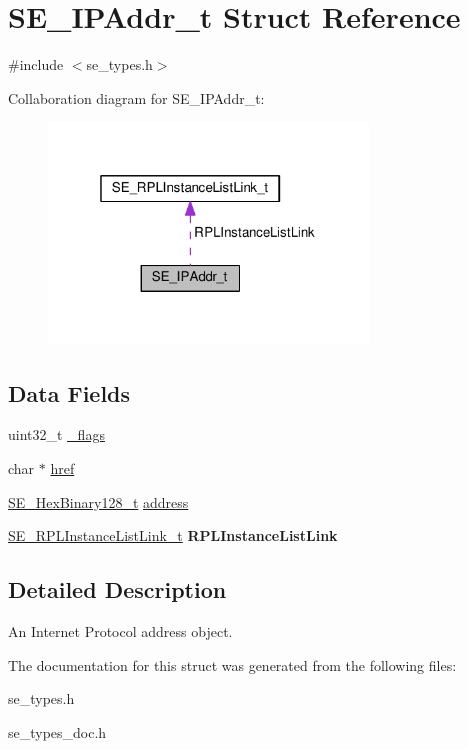 \hypertarget{structSE__IPAddr__t}{}\section{S\+E\+\_\+\+I\+P\+Addr\+\_\+t Struct Reference}
\label{structSE__IPAddr__t}


{\ttfamily \#include $<$se\+\_\+types.\+h$>$}



Collaboration diagram for S\+E\+\_\+\+I\+P\+Addr\+\_\+t\+:\nopagebreak
\begin{figure}[H]
\begin{center}
\leavevmode
\includegraphics[width=241pt]{structSE__IPAddr__t__coll__graph}
\end{center}
\end{figure}
\subsection*{Data Fields}
\begin{DoxyCompactItemize}
\item 
uint32\+\_\+t \hyperlink{group__IPAddr_ga557111ee3a94eb2e68cf42e62bfba40a}{\+\_\+flags}
\item 
char $\ast$ \hyperlink{group__IPAddr_ga3cd3e44c3eb563d397ff73361448715a}{href}
\item 
\hyperlink{group__HexBinary128_gae3e6f0afe8ab371017bc37a0831926c5}{S\+E\+\_\+\+Hex\+Binary128\+\_\+t} \hyperlink{group__IPAddr_gabca0c11bd5af2bce6a3d2537dff98fe3}{address}
\item 
\hyperlink{structSE__RPLInstanceListLink__t}{S\+E\+\_\+\+R\+P\+L\+Instance\+List\+Link\+\_\+t} {\bfseries R\+P\+L\+Instance\+List\+Link}
\end{DoxyCompactItemize}


\subsection{Detailed Description}
An Internet Protocol address object. 

The documentation for this struct was generated from the following files\+:\begin{DoxyCompactItemize}
\item 
se\+\_\+types.\+h\item 
se\+\_\+types\+\_\+doc.\+h\end{DoxyCompactItemize}
